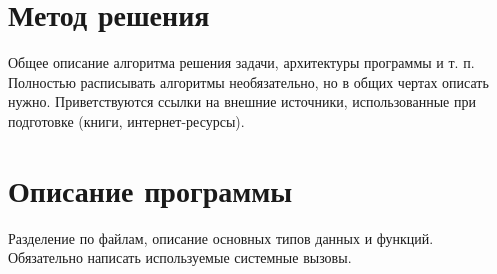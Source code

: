 \section{Метод решения}
Общее описание алгоритма решения задачи, архитектуры программы и т. п. Полностью расписывать алгоритмы необязательно, но в общих чертах описать нужно. Приветствуются ссылки на внешние источники, использованные при подготовке (книги, интернет-ресурсы).

\section{Описание программы}
Разделение по файлам, описание основных типов данных и функций. Обязательно написать используемые системные вызовы.
